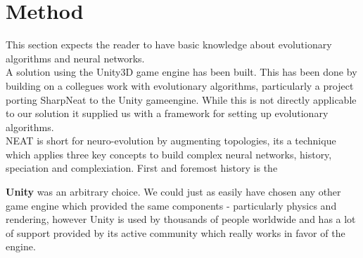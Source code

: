 \section{Method}
This section expects the reader to have basic knowledge about evolutionary algorithms and neural networks.\\

A solution using the Unity3D\cite{web:unity} game engine has been built. This has been done by building on a collegues work with evolutionary algorithms, particularly a project porting SharpNeat\cite{web:unityneat} to the Unity gameengine\cite{web:sharpneat}. While this is not directly applicable to our solution it supplied us with a framework for setting up evolutionary algorithms.\\

NEAT is short for neuro-evolution by augmenting topologies, its a technique which applies three key concepts to build complex neural networks, history, speciation and complexiation. First and foremost history is the 
    
\textbf{Unity} was an arbitrary choice. We could just as easily have chosen any other game engine which provided the same components - particularly physics and rendering, however Unity is used by thousands of people worldwide and has a lot of support provided by its active community which really works in favor of the engine.